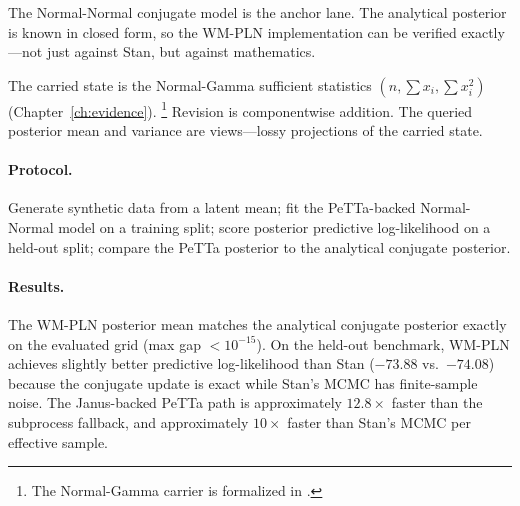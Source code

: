 \documentclass[11pt,openany]{report}
\begin{document}
The Normal-Normal conjugate model is the anchor lane.  The
analytical posterior is known in closed form, so the WM-PLN
implementation can be verified exactly---not just against Stan,
but against mathematics.

The carried state is the Normal-Gamma sufficient statistics
$(n, \sum x_i, \sum x_i^2)$
(Chapter~\ref{ch:evidence}).%
\footnote{The Normal-Gamma carrier is formalized in
.}
Revision is componentwise addition.
The queried posterior mean and variance are views---lossy
projections of the carried state.

\paragraph{Protocol.}
Generate synthetic data from a latent mean; fit the PeTTa-backed
Normal-Normal model on a training split; score posterior predictive
log-likelihood on a held-out split; compare the PeTTa posterior
to the analytical conjugate posterior.

\paragraph{Results.}
The WM-PLN posterior mean matches the analytical conjugate
posterior exactly on the evaluated grid (max gap $< 10^{-15}$).
On the held-out benchmark, WM-PLN achieves slightly better
predictive log-likelihood than Stan ($-73.88$ vs.\ $-74.08$)
because the conjugate update is exact while Stan's MCMC has
finite-sample noise.  The Janus-backed PeTTa path is
approximately $12.8\times$ faster than the subprocess fallback,
and approximately $10\times$ faster than Stan's MCMC per effective
sample.
\end{document}
